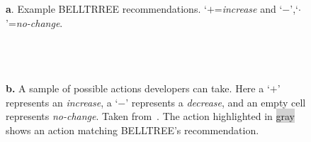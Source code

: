 \begin{figure}
{ \footnotesize
\begin{minipage}{3in}
{\bf  {}a}. Example BELLTRREE recommendations.
`$+$=\textit{increase} and  `$-$',`$\cdot$'=\textit{no-change}.


~\\~\\~\\

{\bf {}b.} A sample of possible actions developers can take.
 Here a `$+$' represents an \textit{increase}, a `$-$' represents a \textit{decrease}, and an empty cell represents \textit{no-change}.
Taken from~\cite{stroggylos2007, du2006study, kataoka2002, bryton2009,elish2011,elish2012}. The action highlighted in \colorbox{lightgray}{gray} shows an  action matching BELLTREE's   recommendation. 


\end{minipage}}
\end{figure}
